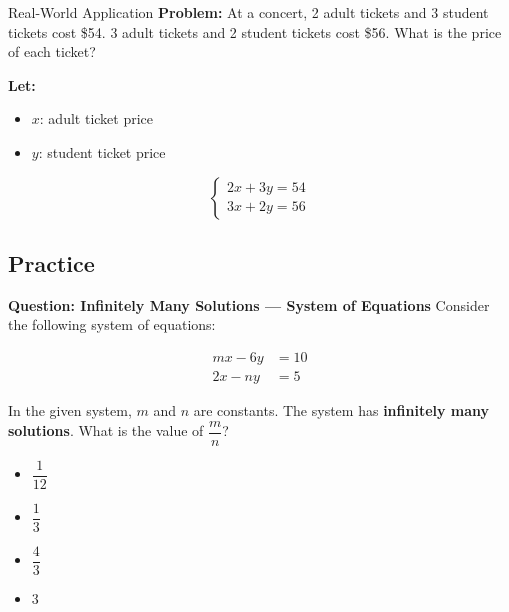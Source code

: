 \documentclass{beamer}
\begin{document}
\begin{frame}{Real-World Application}
  \textbf{Problem:}  
  At a concert, 2 adult tickets and 3 student tickets cost \$54.  
  3 adult tickets and 2 student tickets cost \$56.  
  What is the price of each ticket?

  \textbf{Let:}
  \begin{itemize}
    \item $x$: adult ticket price
    \item $y$: student ticket price
  \end{itemize}

  \[
  \begin{cases}
  2x + 3y = 54 \\
  3x + 2y = 56
  \end{cases}

  \]

\end{frame}

\begin{frame}
    \section{Practice}
\end{frame}



\begin{frame}{\textbf{Question: Infinitely Many Solutions — System of Equations}}
Consider the following system of equations:

\[
\begin{aligned}
mx - 6y &= 10 \\
2x - ny &= 5
\end{aligned}
\]

In the given system, \( m \) and \( n \) are constants.  
The system has \textbf{infinitely many solutions}. What is the value of \( \dfrac{m}{n} \)?

\begin{itemize}
    \item[\textbf{A.}] \( \dfrac{1}{12} \)
    \item[\textbf{B.}] \( \dfrac{1}{3} \)
    \item[\textbf{C.}] \( \dfrac{4}{3} \)
    \item[\textbf{D.}] \( 3 \)
\end{itemize}
\end{frame}
\end{document}
